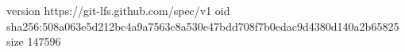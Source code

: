 version https://git-lfs.github.com/spec/v1
oid sha256:508a063e5d212bc4a9a7563c8a530e47bdd708f7b0edac9d4380d140a2b65825
size 147596
